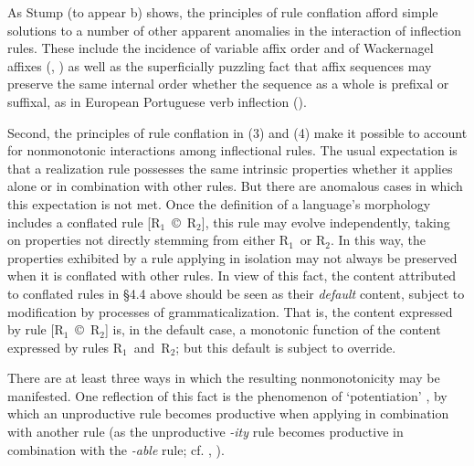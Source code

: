\documentclass[output=paper,
modfonts
]{LSP/langsci}
\begin{document}
	\z
\z        



As Stump (to appear b) shows, the principles of rule conflation afford simple  solutions to a number of other apparent anomalies in the interaction of inflection rules. These include the incidence of variable affix order \citep{Bickel2007} and of Wackernagel affixes (\citealt{Nevis1992},  \citealt{Bonami2008}) as well as the superficially puzzling fact that affix sequences may preserve the same internal order whether the sequence as a whole is prefixal or suffixal, as in European Portuguese verb inflection (\citealt{Luis2005}).

Second, the principles of rule conflation in (3) and (4) make it possible to account for nonmonotonic interactions among inflectional rules.  The usual expectation is that a realization rule possesses the same intrinsic properties whether it applies alone or in combination with other rules.  But there are anomalous cases in which this expectation is not met. Once the definition of a language’s morphology includes a conflated rule [R$_{1}$~©~R$_{2}$], this rule may evolve independently, taking on properties not directly stemming from either R$_{1}$~or R$_{2}$.  In this way, the properties exhibited by a rule applying in isolation may not always be preserved when it is conflated with other rules.  In view of this fact, the content attributed to conflated rules in §4.4 above should be seen as their \textit{default} content, subject to modification by processes of grammaticalization.  That is, the content expressed by rule [R$_{1}$~©~R$_{2}$] is, in the default case, a monotonic function of the content expressed by rules R$_{1}$~and~R$_{2}$; but this default is subject to override.  

There are at least three ways in which the resulting nonmonotonicity may be manifested.  One reflection of this fact is the phenomenon of ‘potentiation’ \citep{Williams1981}, by which an unproductive rule becomes productive when applying in combination with another rule (as the unproductive \textit{\nobreakdash-ity} rule becomes productive in combination with the \textit{\nobreakdash-able} rule; cf. \citealt{Aronoff1976}, \citealt{Bochner1992}).  
\end{document}
